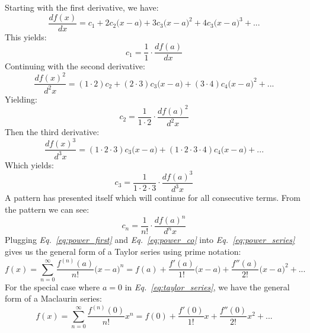 \vspace{0.5cm}
\noindent
Starting with the first derivative, we have:
    \begin{equation*}
        \frac{df(x)}{dx} = c_1 + 2c_2{\big(x - a\big)} + 3c_3{\big(x - a\big)}^2
        + 4c_3{\big(x - a\big)}^3 + ...
    \end{equation*}
This yields:
    \begin{equation*}
        c_1 = \frac{1}{1} \cdot \frac{df(a)}{dx}
    \end{equation*}
Continuing with the second derivative:
    \begin{equation*}
        \frac{{df(x)}^2}{d^2x} = (1 \cdot 2)c_2 + (2 \cdot 3)c_3{\big(x - a\big)} + (3 \cdot 4)c_4{\big(x - a\big)}^2
        + ...
    \end{equation*}
Yielding:
    \begin{equation*}
        c_2 = \frac{1}{1 \cdot 2} \cdot \frac{{df(a)}^2}{d^2x}
    \end{equation*}
Then the third derivative:
    \begin{equation*}
        \frac{{df(x)}^3}{d^3x} = (1 \cdot 2 \cdot 3)c_3{\big(x - a\big)}
        + (1 \cdot 2 \cdot 3 \cdot 4)c_4{\big(x - a\big)} + ...
    \end{equation*}
Which yields:
    \begin{equation*}
        c_3 = \frac{1}{1 \cdot 2 \cdot 3} \cdot \frac{{df(a)}^3}{d^3x}
    \end{equation*}
A pattern has presented itself which will continue for all consecutive terms.  From the pattern we can see:
    \begin{equation}
        c_n = \frac{1}{n!} \cdot \frac{{df(a)}^n}{d^nx}
        \label{eq:power_co}
    \end{equation}
Plugging \emph{Eq.~\ref{eq:power_first}} and \emph{Eq.~\ref{eq:power_co}} into \emph{Eq.~\ref{eq:power_series}} gives us the general form of a Taylor series using prime notation:
    \begin{equation}
        f(x) = \sum_{n=0}^{\infty}\frac{f^{(n)}(a)}{n!}{\big(x - a\big)}^n = f(a)
        + \frac{f'(a)}{1!}{\big(x - a\big)} + \frac{f''(a)}{2!}{\big(x - a\big)}^2 + ...
        \label{eq:taylor_series}
    \end{equation}
For the special case where $a = 0$ in \emph{Eq.~\ref{eq:taylor_series}}, we have the general form of a Maclaurin series:
    \begin{equation}
        f(x) = \sum_{n=0}^{\infty}\frac{f^{(n)}(0)}{n!}{x}^n = f(0)
        + \frac{f'(0)}{1!}{x} + \frac{f''(0)}{2!}{x}^2 + ...
        \label{eq:maclaurin_series}
    \end{equation}
